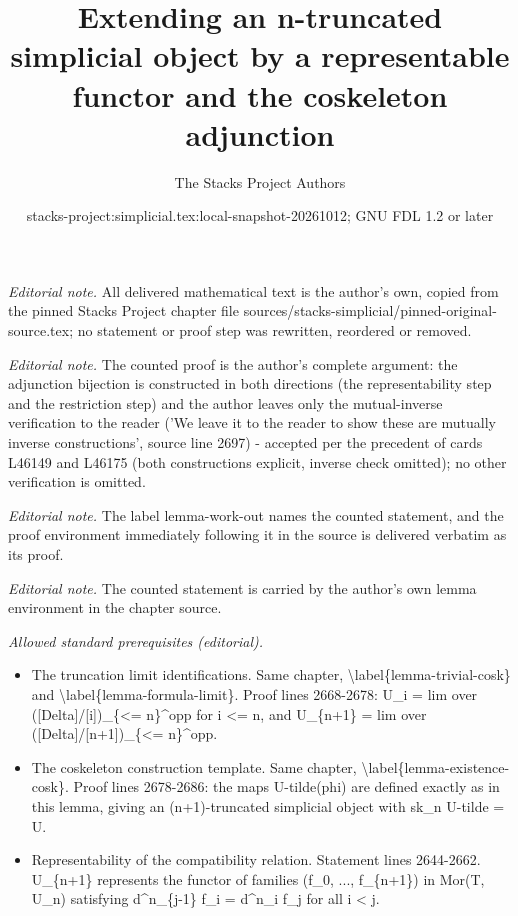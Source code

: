 \documentclass{stacks-project}
\title{Extending an n-truncated simplicial object by a representable functor and the coskeleton adjunction}
\author{The Stacks Project Authors}
\date{stacks-project:simplicial.tex:local-snapshot-20261012; GNU FDL 1.2 or later}
\theoremstyle{plain}
\theoremstyle{definition}
\theoremstyle{remark}
\numberwithin{equation}{subsection}
\begin{document}
\maketitle
\noindent\textit{Editorial note.} All delivered mathematical text is the author's own, copied from the pinned Stacks Project chapter file sources/stacks-simplicial/pinned-original-source.tex; no statement or proof step was rewritten, reordered or removed.\par\medskip
\noindent\textit{Editorial note.} The counted proof is the author's complete argument: the adjunction bijection is constructed in both directions (the representability step and the restriction step) and the author leaves only the mutual-inverse verification to the reader ('We leave it to the reader to show these are mutually inverse constructions', source line 2697) - accepted per the precedent of cards L46149 and L46175 (both constructions explicit, inverse check omitted); no other verification is omitted.\par\medskip
\noindent\textit{Editorial note.} The label lemma-work-out names the counted statement, and the proof environment immediately following it in the source is delivered verbatim as its proof.\par\medskip
\noindent\textit{Editorial note.} The counted statement is carried by the author's own lemma environment in the chapter source.\par\medskip
\noindent\textit{Allowed standard prerequisites (editorial).}\begin{itemize}
\item The truncation limit identifications. Same chapter, \textbackslash{}label\{lemma-trivial-cosk\} and \textbackslash{}label\{lemma-formula-limit\}. Proof lines 2668-2678: U\_i = lim over ([Delta]/[i])\_\{<= n\}\textasciicircum{}opp for i <= n, and U\_\{n+1\} = lim over ([Delta]/[n+1])\_\{<= n\}\textasciicircum{}opp.
\item The coskeleton construction template. Same chapter, \textbackslash{}label\{lemma-existence-cosk\}. Proof lines 2678-2686: the maps U-tilde(phi) are defined exactly as in this lemma, giving an (n+1)-truncated simplicial object with sk\_n U-tilde = U.
\item Representability of the compatibility relation. Statement lines 2644-2662. U\_\{n+1\} represents the functor of families (f\_0, ..., f\_\{n+1\}) in Mor(T, U\_n) satisfying d\textasciicircum{}n\_\{j-1\} f\_i = d\textasciicircum{}n\_i f\_j for all i < j.
\end{itemize}\medskip
\end{document}
